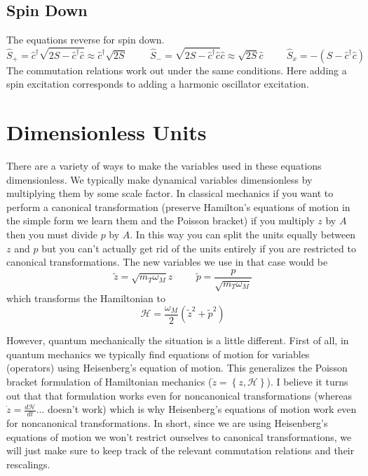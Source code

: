 \documentclass[12pt]{article}
\begin{document}
\subsection{Spin Down}
The equations reverse for spin down.
\begin{equation}
\hat{S}_+ = \hat{c}^{\dag} \sqrt{2S - \hat{c}^{\dag} \hat{c}} \approx \hat{c}^{\dag} \sqrt{2S} \hspace{1cm}
\hat{S}_- = \sqrt{2S - \hat{c}^{\dag} \hat{c}} \hat{c} \approx \sqrt{2S} \hat{c} \hspace{1cm} \hat{S}_x = -(S- \hat{c}^{\dag} \hat{c})
\end{equation}
The commutation relations work out under the same conditions. Here adding a spin excitation corresponds to adding a harmonic oscillator excitation.


\section{Dimensionless Units}
There are a variety of ways to make the variables used in these equations dimensionless. We typically make dynamical variables dimensionless by multiplying them by some scale factor. In classical mechanics if you want to perform a canonical transformation (preserve Hamilton's equations of motion in the simple form we learn them and the Poisson bracket) if you multiply $z$ by $A$ then you must divide $p$ by $A$. In this way you can split the units equally between $z$ and $p$ but you can't actually get rid of the units entirely if you are restricted to canonical transformations. The new variables we use in that case would be 
\[
\tilde{z} = \sqrt{m_T \omega_M} z \hspace{1cm} \tilde{p} = \frac{p}{\sqrt{m_T \omega_M}} \]
which transforms the Hamiltonian to
\[ \mathcal{H} = \frac{\omega_M}{2} \left( \tilde{z}^2 + \tilde{p}^2 \right) \]

However, quantum mechanically the situation is a little different. First of all, in quantum mechanics we typically find equations of motion for variables (operators) using Heisenberg's equation of motion. This generalizes the Poisson bracket formulation of Hamiltonian mechanics ($\dot{z} = \left\lbrace z,\mathcal{H}\right\rbrace$). I believe it turns out that that formulation works even for noncanonical transformations (whereas $\dot{z} = \frac{d\mathcal{H}}{dt}$... doesn't work) which is why Heisenberg's equations of motion work even for noncanonical transformations. In short, since we are using Heisenberg's equations of motion we won't restrict ourselves to canonical transformations, we will just make sure to keep track of the relevant commutation relations and their rescalings.
\end{document}
